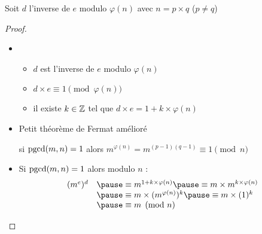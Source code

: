 \begin{frame}

\begin{lemme}
Soit $d$ l'inverse de $e$ modulo $\varphi(n)$ avec $n=p\times q$ \quad ($p\not= q$)
\end{lemme}

\pause
\renewcommand{\qedsymbol}{}
\begin{proof}
\begin{itemize}
  \item 
  \begin{itemize}
    \item $d$ est l'inverse de $e$ modulo $\varphi(n)$
\pause    
    
    \item $d \times e \equiv 1 \pmod {\varphi(n)}$
\pause    
    
    \item il existe $k \in \mathbb{Z}$ tel que $d \times e = 1 + k \times \varphi(n)$
  \end{itemize}
  
\pause  
  \item Petit théorème de Fermat amélioré
  
\pause  
  \centerline{si \quad $\mathop{\text{pgcd}}\nolimits(m,n)=1$ \quad alors \quad $m^{\varphi(n)} = m^{(p-1)(q-1)} \equiv 1 \pmod n$}

\pause  
  \item Si $\mathop{\text{pgcd}}\nolimits(m,n)=1$ alors modulo $n$ : %
\vspace*{-1ex} 
$$
\begin{array}{rl}
 (m^e)^d&  \pause\equiv m^{1+k \times \varphi(n)} \pause\equiv m \times m^{k \times \varphi(n)}  \\
      & \pause\equiv m \times (m^{\varphi(n)})^k  \pause\equiv m \times (1)^k \\
      & \pause\equiv m \pmod {n}
\end{array}$$
\vspace*{-6ex}%
\end{itemize}
\end{proof}
\end{frame}


